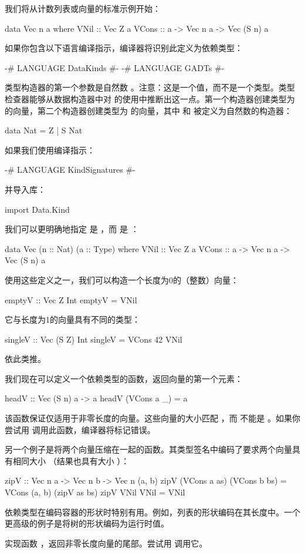 \documentclass[DaoFP]{subfiles}
\begin{document}
我们将从计数列表或向量的标准示例开始：
\begin{haskell}
data Vec n a where
    VNil  :: Vec Z a
    VCons :: a -> Vec n a -> Vec (S n) a
\end{haskell}
如果你包含以下语言编译指示，编译器将识别此定义为依赖类型：
\begin{haskell}
{-# LANGUAGE DataKinds #-}
{-# LANGUAGE GADTs #-}
\end{haskell}
类型构造器的第一个参数是自然数 。注意：这是一个值，而不是一个类型。类型检查器能够从数据构造器中对  的使用中推断出这一点。第一个构造器创建类型为  的向量，第二个构造器创建类型为  的向量，其中  和  被定义为自然数的构造器：
\begin{haskell}
data Nat = Z | S Nat
\end{haskell}

如果我们使用编译指示：
\begin{haskell}
{-# LANGUAGE KindSignatures #-}
\end{haskell}
并导入库：
\begin{haskell}
import Data.Kind
\end{haskell}
我们可以更明确地指定  是 ，而  是 ：
\begin{haskell}
data Vec (n :: Nat) (a :: Type) where
    VNil  :: Vec Z a
    VCons :: a -> Vec n a -> Vec (S n) a
\end{haskell}

使用这些定义之一，我们可以构造一个长度为0的（整数）向量：
\begin{haskell}
emptyV :: Vec Z Int
emptyV = VNil
\end{haskell}
它与长度为1的向量具有不同的类型：
\begin{haskell}
singleV :: Vec (S Z) Int
singleV = VCons 42 VNil
\end{haskell}
依此类推。

我们现在可以定义一个依赖类型的函数，返回向量的第一个元素：
\begin{haskell}
headV :: Vec (S n) a -> a
headV (VCons a _) = a
\end{haskell}
该函数保证仅适用于非零长度的向量。这些向量的大小匹配 ，而  不能是 。如果你尝试用  调用此函数，编译器将标记错误。

另一个例子是将两个向量压缩在一起的函数。其类型签名中编码了要求两个向量具有相同大小 （结果也具有大小 ）：
\begin{haskell}
zipV :: Vec n a -> Vec n b -> Vec n (a, b)
zipV (VCons a as) (VCons b bs) = VCons (a, b) (zipV as bs)
zipV VNil VNil = VNil
\end{haskell}

依赖类型在编码容器的形状时特别有用。例如，列表的形状编码在其长度中。一个更高级的例子是将树的形状编码为运行时值。

\begin{exercise}
实现函数 ，返回非零长度向量的尾部。尝试用  调用它。
\end{exercise}
\end{document}
